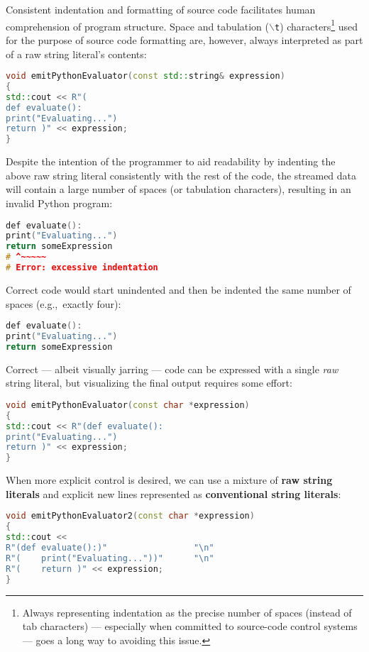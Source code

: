 Consistent indentation and formatting of source code facilitates human
comprehension of program structure. Space and tabulation
(\texttt{$\backslash$t}) characters{\cprotect\footnote{Always
representing indentation as the precise number of spaces (instead of
tab characters) --- especially when committed to source-code control
systems --- goes a long way to avoiding this issue.}} used for the
purpose of source code formatting are, however, always interpreted as
part of a raw string literal's contents:

\begin{lstlisting}[language=C++]
void emitPythonEvaluator(const std::string& expression)
{
std::cout << R"(
def evaluate():
print("Evaluating...")
return )" << expression;
}
\end{lstlisting}

\noindent Despite the intention of the programmer to aid readability by indenting
the above raw string literal consistently with the rest of the code, the
streamed data will contain a large number of spaces (or tabulation
characters), resulting in an invalid Python program:

\begin{lstlisting}[language=C++]
def evaluate():
print("Evaluating...")
return someExpression
# ^~~~~~
# Error: excessive indentation
\end{lstlisting}

\noindent Correct code would start unindented and then be indented the same number
of spaces (e.g.,~exactly four):

\begin{lstlisting}[language=C++]
def evaluate():
print("Evaluating...")
return someExpression
\end{lstlisting}

\noindent Correct --- albeit visually jarring --- code can be expressed with a
single \emph{raw} string literal, but visualizing the final output requires some effort:

\begin{lstlisting}[language=C++]
void emitPythonEvaluator(const char *expression)
{
std::cout << R"(def evaluate():
print("Evaluating...")
return )" << expression;
}
\end{lstlisting}

\noindent When more explicit control is desired, we can use a mixture of
\textbf{raw string literals} and explicit new lines represented as
\textbf{conventional string literals}:

\begin{lstlisting}[language=C++]
void emitPythonEvaluator2(const char *expression)
{
std::cout <<
R"(def evaluate():)"                 "\n"
R"(    print("Evaluating..."))"      "\n"
R"(    return )" << expression;
}
\end{lstlisting}


